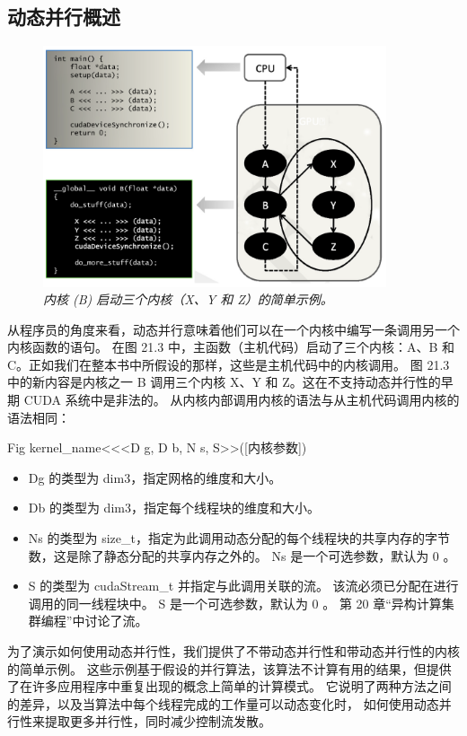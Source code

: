 \subsection{动态并行概述}
\begin{figure}[H]
	\centering
	\includegraphics[width=0.9\textwidth]{figs/F21.3.png}
	\caption{\textit{内核 (B) 启动三个内核（X、Y 和 Z）的简单示例。}}
\end{figure}

从程序员的角度来看，动态并行意味着他们可以在一个内核中编写一条调用另一个内核函数的语句。 
在图 21.3 中，主函数（主机代码）启动了三个内核：A、B 和 C。正如我们在整本书中所假设的那样，这些是主机代码中的内核调用。 
图 21.3 中的新内容是内核之一 B 调用三个内核 X、Y 和 Z。这在不支持动态并行性的早期 CUDA 系统中是非法的。 
从内核内部调用内核的语法与从主机代码调用内核的语法相同：

{\color{red} Fig}
kernel\_name<<<D g, D b, N s, S>>([内核参数])

\begin{itemize}
   \item Dg 的类型为 dim3，指定网格的维度和大小。
   \item Db 的类型为 dim3，指定每个线程块的维度和大小。
   \item Ns 的类型为 size\_t，指定为此调用动态分配的每个线程块的共享内存的字节数，这是除了静态分配的共享内存之外的。 
   		Ns 是一个可选参数，默认为 0 。
   \item S 的类型为 cudaStream\_t 并指定与此调用关联的流。 该流必须已分配在进行调用的同一线程块中。 
   		S 是一个可选参数，默认为 0 。 第 20 章“异构计算集群编程”中讨论了流。
\end{itemize}

为了演示如何使用动态并行性，我们提供了不带动态并行性和带动态并行性的内核的简单示例。 
这些示例基于假设的并行算法，该算法不计算有用的结果，但提供了在许多应用程序中重复出现的概念上简单的计算模式。 
它说明了两种方法之间的差异，以及当算法中每个线程完成的工作量可以动态变化时，
如何使用动态并行性来提取更多并行性，同时减少控制流发散。

